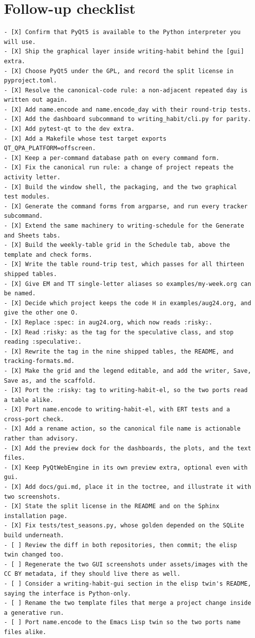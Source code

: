 \documentclass[11pt]{article}
\begin{document}
\section{Follow-up checklist}
\label{sec:org58c37a5}

\begin{verbatim}
- [X] Confirm that PyQt5 is available to the Python interpreter you will use.
- [X] Ship the graphical layer inside writing-habit behind the [gui] extra.
- [X] Choose PyQt5 under the GPL, and record the split license in pyproject.toml.
- [X] Resolve the canonical-code rule: a non-adjacent repeated day is written out again.
- [X] Add name.encode and name.encode_day with their round-trip tests.
- [X] Add the dashboard subcommand to writing_habit/cli.py for parity.
- [X] Add pytest-qt to the dev extra.
- [X] Add a Makefile whose test target exports QT_QPA_PLATFORM=offscreen.
- [X] Keep a per-command database path on every command form.
- [X] Fix the canonical run rule: a change of project repeats the activity letter.
- [X] Build the window shell, the packaging, and the two graphical test modules.
- [X] Generate the command forms from argparse, and run every tracker subcommand.
- [X] Extend the same machinery to writing-schedule for the Generate and Sheets tabs.
- [X] Build the weekly-table grid in the Schedule tab, above the template and check forms.
- [X] Write the table round-trip test, which passes for all thirteen shipped tables.
- [X] Give EM and TT single-letter aliases so examples/my-week.org can be named.
- [X] Decide which project keeps the code H in examples/aug24.org, and give the other one O.
- [X] Replace :spec: in aug24.org, which now reads :risky:.
- [X] Read :risky: as the tag for the speculative class, and stop reading :speculative:.
- [X] Rewrite the tag in the nine shipped tables, the README, and tracking-formats.md.
- [X] Make the grid and the legend editable, and add the writer, Save, Save as, and the scaffold.
- [X] Port the :risky: tag to writing-habit-el, so the two ports read a table alike.
- [X] Port name.encode to writing-habit-el, with ERT tests and a cross-port check.
- [X] Add a rename action, so the canonical file name is actionable rather than advisory.
- [X] Add the preview dock for the dashboards, the plots, and the text files.
- [X] Keep PyQtWebEngine in its own preview extra, optional even with gui.
- [X] Add docs/gui.md, place it in the toctree, and illustrate it with two screenshots.
- [X] State the split license in the README and on the Sphinx installation page.
- [X] Fix tests/test_seasons.py, whose golden depended on the SQLite build underneath.
- [ ] Review the diff in both repositories, then commit; the elisp twin changed too.
- [ ] Regenerate the two GUI screenshots under assets/images with the CC BY metadata, if they should live there as well.
- [ ] Consider a writing-habit-gui section in the elisp twin's README, saying the interface is Python-only.
- [ ] Rename the two template files that merge a project change inside a generative run.
- [ ] Port name.encode to the Emacs Lisp twin so the two ports name files alike.
\end{verbatim}
\end{document}
